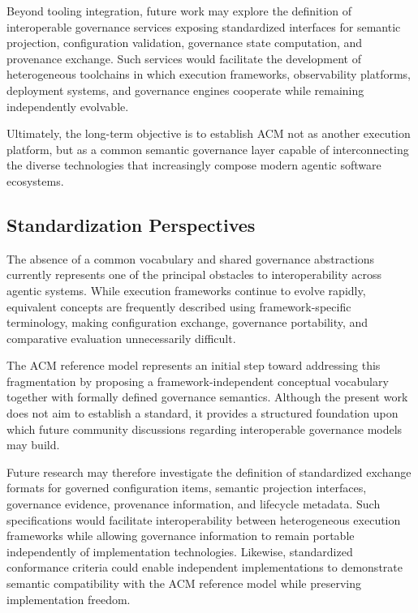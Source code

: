 \documentclass[10pt]{article}
\begin{document}
Beyond tooling integration, future work may explore the definition of interoperable governance services exposing standardized interfaces for semantic projection, configuration validation, governance state computation, and provenance exchange. Such services would facilitate the development of heterogeneous toolchains in which execution frameworks, observability platforms, deployment systems, and governance engines cooperate while remaining independently evolvable.

Ultimately, the long-term objective is to establish ACM not as another execution platform, but as a common semantic governance layer capable of interconnecting the diverse technologies that increasingly compose modern agentic software ecosystems.

\subsection{Standardization Perspectives}
\label{sec:future_standardization}

The absence of a common vocabulary and shared governance abstractions currently represents one of the principal obstacles to interoperability across agentic systems. While execution frameworks continue to evolve rapidly, equivalent concepts are frequently described using framework-specific terminology, making configuration exchange, governance portability, and comparative evaluation unnecessarily difficult.

The ACM reference model represents an initial step toward addressing this fragmentation by proposing a framework-independent conceptual vocabulary together with formally defined governance semantics. Although the present work does not aim to establish a standard, it provides a structured foundation upon which future community discussions regarding interoperable governance models may build.

Future research may therefore investigate the definition of standardized exchange formats for governed configuration items, semantic projection interfaces, governance evidence, provenance information, and lifecycle metadata. Such specifications would facilitate interoperability between heterogeneous execution frameworks while allowing governance information to remain portable independently of implementation technologies. Likewise, standardized conformance criteria could enable independent implementations to demonstrate semantic compatibility with the ACM reference model while preserving implementation freedom.
\end{document}
